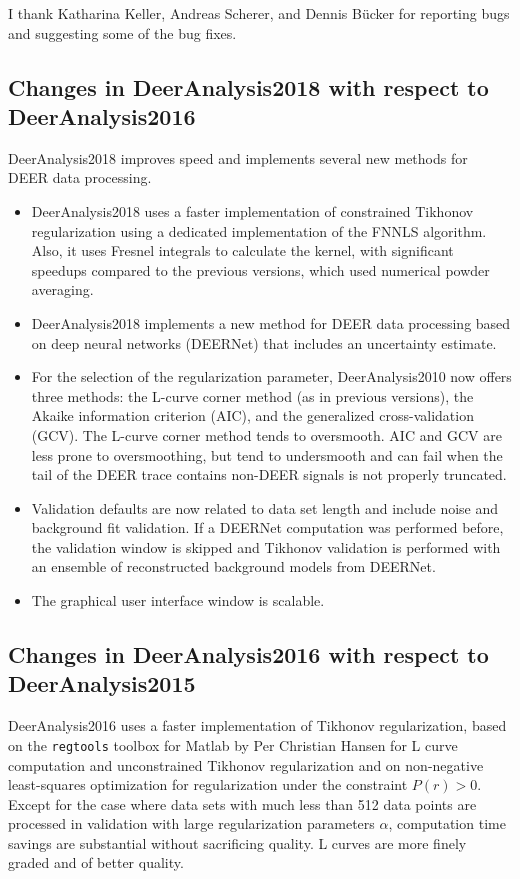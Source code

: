 \documentclass{article}
\begin{document}
I thank Katharina Keller, Andreas Scherer, and Dennis B\"ucker for reporting bugs and suggesting some of the bug fixes.

\subsection{Changes in DeerAnalysis2018 with respect to DeerAnalysis2016}
\label{changes_2018}

DeerAnalysis2018 improves speed and implements several new methods for DEER data processing.

\begin{itemize}
\item
DeerAnalysis2018 uses a faster implementation of constrained Tikhonov regularization using a dedicated implementation of the FNNLS algorithm. Also, it uses Fresnel integrals to calculate the kernel, with significant speedups compared to the previous versions, which used numerical powder averaging.
\item
DeerAnalysis2018 implements a new method for DEER data processing based on deep neural networks (DEERNet) that includes an uncertainty estimate.
\item
For the selection of the regularization parameter, DeerAnalysis2010 now offers three methods: the L-curve corner method (as in previous versions), the Akaike information criterion (AIC), and the generalized cross-validation (GCV). The L-curve corner method tends to oversmooth. AIC and GCV are less prone to oversmoothing, but tend to undersmooth and can fail when the tail of the DEER trace contains non-DEER signals is not properly truncated.
\item
Validation defaults are now related to data set length and include noise and background fit validation. If a DEERNet computation was performed before, the validation window is skipped and Tikhonov validation is performed with an ensemble of reconstructed background models from DEERNet.
\item
The graphical user interface window is scalable. 
\end{itemize}

\subsection{Changes in DeerAnalysis2016 with respect to DeerAnalysis2015}
\label{changes_2016}

DeerAnalysis2016 uses a faster implementation of Tikhonov regularization, based on the \texttt{regtools} toolbox for Matlab by Per Christian Hansen for L curve computation and unconstrained Tikhonov regularization and on non-negative least-squares optimization for regularization under the constraint $P(r) > 0$. Except for the case where data sets with much less than 512 data points are processed in validation with large regularization parameters $\alpha$, computation time savings are substantial without sacrificing quality. L curves are more finely graded and of better quality. 
\end{document}
